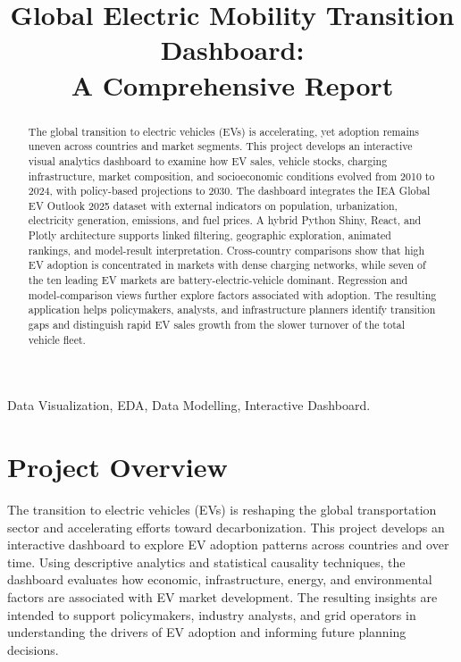 \documentclass[12pt,conference]{IEEEtran}
\title{Global Electric Mobility Transition Dashboard: \\ A Comprehensive Report}
\author{
    \IEEEauthorblockN{Pham Quynh Trang}
    \IEEEauthorblockA{
    22trang.pq@vinuni.edu.vn}
    \and
    \IEEEauthorblockN{Tran Phuong Mai}
    \IEEEauthorblockA{
    24mai.tp@vinuni.edu.vn}
    \and
    \IEEEauthorblockN{Nguyen Thi Bao Tien}
    \IEEEauthorblockA{
    24tien.ntb@vinuni.edu.vn}
    \and
    \IEEEauthorblockN{Nguyen Khanh Ngoc}
    \IEEEauthorblockA{
    24ngoc.nk@vinuni.edu.vn}
}
\begin{document}
\maketitle

\thispagestyle{firststyle}
\pagestyle{firststyle}

\begin{abstract}
The global transition to electric vehicles (EVs) is accelerating, yet adoption remains uneven across countries and market segments. This project develops an interactive visual analytics dashboard to examine how EV sales, vehicle stocks, charging infrastructure, market composition, and socioeconomic conditions evolved from 2010 to 2024, with policy-based projections to 2030. The dashboard integrates the IEA Global EV Outlook 2025 dataset with external indicators on population, urbanization, electricity generation, emissions, and fuel prices. A hybrid Python Shiny, React, and Plotly architecture supports linked filtering, geographic exploration, animated rankings, and model-result interpretation. Cross-country comparisons show that high EV adoption is concentrated in markets with dense charging networks, while seven of the ten leading EV markets are battery-electric-vehicle dominant. Regression and model-comparison views further explore factors associated with adoption. The resulting application helps policymakers, analysts, and infrastructure planners identify transition gaps and distinguish rapid EV sales growth from the slower turnover of the total vehicle fleet.
\end{abstract}

\begin{IEEEkeywords}
Data Visualization, EDA, Data Modelling, Interactive Dashboard.
\end{IEEEkeywords}

\section{Project Overview}
The transition to electric vehicles (EVs) is reshaping the global transportation sector and accelerating efforts toward decarbonization. This project develops an interactive dashboard to explore EV adoption patterns across countries and over time. Using descriptive analytics and statistical causality techniques, the dashboard evaluates how economic, infrastructure, energy, and environmental factors are associated with EV market development. The resulting insights are intended to support policymakers, industry analysts, and grid operators in understanding the drivers of EV adoption and informing future planning decisions.
\end{document}
